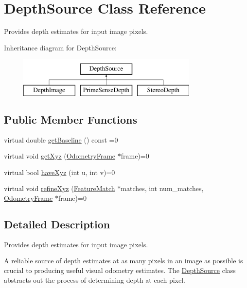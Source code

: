 \hypertarget{classfovis_1_1DepthSource}{
\section{DepthSource Class Reference}
\label{classfovis_1_1DepthSource}
}


Provides depth estimates for input image pixels.  


Inheritance diagram for DepthSource:\begin{figure}[H]
\begin{center}
\leavevmode
\includegraphics[height=2.000000cm]{classfovis_1_1DepthSource}
\end{center}
\end{figure}
\subsection*{Public Member Functions}
\begin{DoxyCompactItemize}
\item 
virtual double \hyperlink{classfovis_1_1DepthSource_a22d76295f183f3ec9e34d2d7e837c675}{getBaseline} () const =0
\item 
virtual void \hyperlink{classfovis_1_1DepthSource_a0259f77a02ba85f5370407db4759d16a}{getXyz} (\hyperlink{classfovis_1_1OdometryFrame}{OdometryFrame} $\ast$frame)=0
\item 
virtual bool \hyperlink{classfovis_1_1DepthSource_ad0d2b9dd0e48e428319c3c84e87fa5cf}{haveXyz} (int u, int v)=0
\item 
virtual void \hyperlink{classfovis_1_1DepthSource_a4d6eafb84371d0720cd7ee53ac2e659a}{refineXyz} (\hyperlink{classfovis_1_1FeatureMatch}{FeatureMatch} $\ast$matches, int num\_\-matches, \hyperlink{classfovis_1_1OdometryFrame}{OdometryFrame} $\ast$frame)=0
\end{DoxyCompactItemize}


\subsection{Detailed Description}
Provides depth estimates for input image pixels. 

A reliable source of depth estimates at as many pixels in an image as possible is crucial to producing useful visual odometry estimates. The \hyperlink{classfovis_1_1DepthSource}{DepthSource} class abstracts out the process of determining depth at each pixel.

